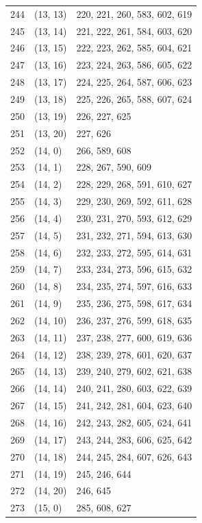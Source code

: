 \documentclass{article}
\begin{document}
\begin{longtable}{lll}
  244 & (13, 13) & 220, 221, 260, 583, 602, 619 \\
  245 & (13, 14) & 221, 222, 261, 584, 603, 620 \\
  246 & (13, 15) & 222, 223, 262, 585, 604, 621 \\
  247 & (13, 16) & 223, 224, 263, 586, 605, 622 \\
  248 & (13, 17) & 224, 225, 264, 587, 606, 623 \\
  249 & (13, 18) & 225, 226, 265, 588, 607, 624 \\
  250 & (13, 19) & 226, 227, 625 \\
  251 & (13, 20) & 227, 626 \\
  252 & (14, 0) & 266, 589, 608 \\
  253 & (14, 1) & 228, 267, 590, 609 \\
  254 & (14, 2) & 228, 229, 268, 591, 610, 627 \\
  255 & (14, 3) & 229, 230, 269, 592, 611, 628 \\
  256 & (14, 4) & 230, 231, 270, 593, 612, 629 \\
  257 & (14, 5) & 231, 232, 271, 594, 613, 630 \\
  258 & (14, 6) & 232, 233, 272, 595, 614, 631 \\
  259 & (14, 7) & 233, 234, 273, 596, 615, 632 \\
  260 & (14, 8) & 234, 235, 274, 597, 616, 633 \\
  261 & (14, 9) & 235, 236, 275, 598, 617, 634 \\
  262 & (14, 10) & 236, 237, 276, 599, 618, 635 \\
  263 & (14, 11) & 237, 238, 277, 600, 619, 636 \\
  264 & (14, 12) & 238, 239, 278, 601, 620, 637 \\
  265 & (14, 13) & 239, 240, 279, 602, 621, 638 \\
  266 & (14, 14) & 240, 241, 280, 603, 622, 639 \\
  267 & (14, 15) & 241, 242, 281, 604, 623, 640 \\
  268 & (14, 16) & 242, 243, 282, 605, 624, 641 \\
  269 & (14, 17) & 243, 244, 283, 606, 625, 642 \\
  270 & (14, 18) & 244, 245, 284, 607, 626, 643 \\
  271 & (14, 19) & 245, 246, 644 \\
  272 & (14, 20) & 246, 645 \\
  273 & (15, 0) & 285, 608, 627 \\

\end{longtable}
\end{document}
